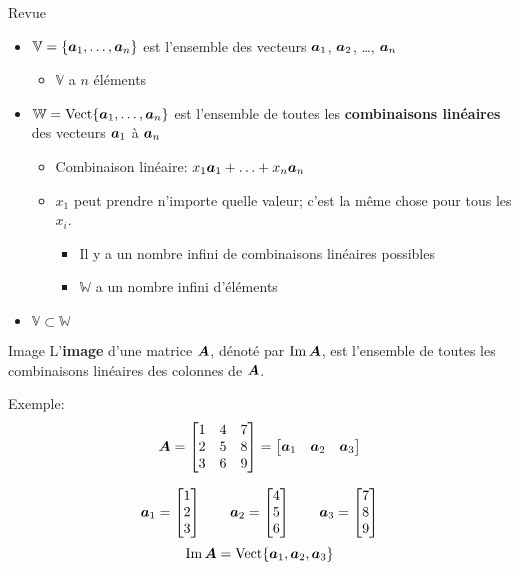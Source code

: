 \documentclass[french, handout]{beamer}
\begin{document}
\begin{frame}{Revue}

\begin{itemize}
\item  $\mathbb{V} = \{\boldsymbol{a}_1, \ldots, \boldsymbol{a}_n\}$ est l'ensemble des
vecteurs $\boldsymbol{a}_1$, $\boldsymbol{a}_2$, \ldots, $\boldsymbol{a}_n$
	\begin{itemize}
	\item  $\mathbb{V}$ a $n$ éléments
	\end{itemize}
\item $\mathbb{W} = \operatorname{Vect}\{\boldsymbol{a}_1, \ldots, \boldsymbol{a}_n\}$ est l'ensemble de toutes les \textbf{combinaisons linéaires} des
vecteurs $\boldsymbol{a}_1$ à $\boldsymbol{a}_n$
	\begin{itemize}
	\item Combinaison linéaire: $x_1\boldsymbol{a}_1 + \ldots + x_n\boldsymbol{a}_n$
	\item $x_1$ peut prendre n'importe quelle valeur; c'est la même chose pour tous les $x_i$.
		\begin{itemize}
		\item Il y a un nombre infini de combinaisons linéaires possibles
		\item $\mathbb{W}$ a un nombre infini d'éléments
		\end{itemize}
	\end{itemize}
\item $\mathbb{V} \subset \mathbb{W}$
\end{itemize}

\end{frame}		
	
	
\begin{frame}{Image}
L'\textbf{image} d'une matrice $\boldsymbol{A}$, dénoté par $\operatorname{Im}\boldsymbol{A}$, est l'ensemble de toutes les combinaisons linéaires
des colonnes de $\boldsymbol{A}$.

Exemple:
\[
\boldsymbol{A} = \begin{bmatrix}
1 & 4 & 7\\
2 & 5 & 8\\
3 & 6 & 9
\end{bmatrix}
=
\begin{bmatrix}
\boldsymbol{a}_1 & \boldsymbol{a}_2 & \boldsymbol{a}_3
\end{bmatrix}
\]

\[
\boldsymbol{a}_1 = \begin{bmatrix}
1 \\ 2 \\ 3
\end{bmatrix}
\qquad
\boldsymbol{a}_2 = \begin{bmatrix}
4 \\ 5\\6
\end{bmatrix}
\qquad
\boldsymbol{a}_3 = \begin{bmatrix}
7\\8\\9
\end{bmatrix}
\]
\[
\operatorname{Im}\boldsymbol{A} = \operatorname{Vect}\{\boldsymbol{a}_1, \boldsymbol{a}_2, \boldsymbol{a}_3\}
\]
\end{frame}	
\end{document}
